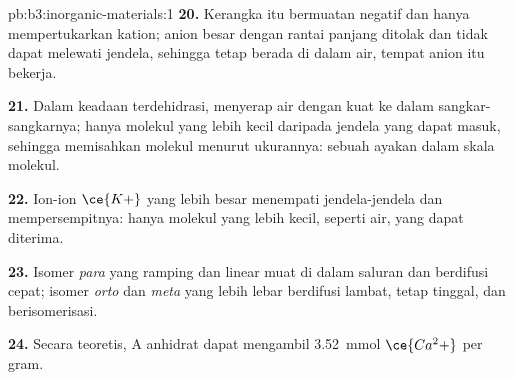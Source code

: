 \begin{solution}{pb:b3:inorganic-materials:1}
\textbf{20.} Kerangka itu bermuatan negatif dan hanya mempertukarkan kation; anion
besar dengan rantai panjang ditolak dan tidak dapat melewati jendela, sehingga tetap
berada di dalam air, tempat anion itu bekerja.

\textbf{21.} Dalam keadaan terdehidrasi,  menyerap air dengan kuat ke dalam sangkar-sangkarnya; hanya
molekul yang lebih kecil daripada jendela yang dapat masuk, sehingga  memisahkan molekul menurut ukurannya:
sebuah ayakan dalam skala molekul.

\textbf{22.} Ion-ion $\ce{K+}$ yang lebih besar menempati jendela-jendela dan mempersempitnya: hanya molekul
yang lebih kecil, seperti air, yang dapat diterima.

\textbf{23.} Isomer \textit{para} yang ramping dan linear muat di dalam saluran dan berdifusi cepat; isomer
\textit{orto} dan \textit{meta} yang lebih lebar berdifusi lambat, tetap tinggal, dan berisomerisasi.

\textbf{24.} Secara teoretis,  A anhidrat dapat mengambil \qty{3.52}{mmol} $\ce{Ca^2+}$ per gram.
\end{solution}
